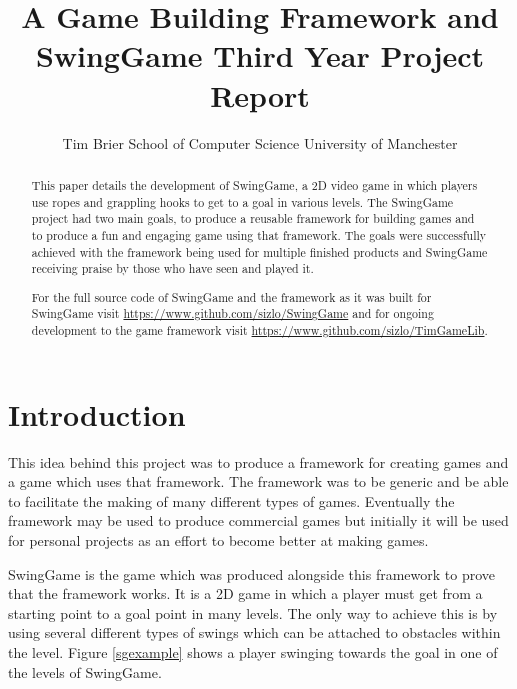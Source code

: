 \documentclass[]{report}
\title{
	A Game Building Framework and SwingGame\endgraf
	Third Year Project Report
}
\author{
	\parbox{\linewidth}{
		\centering%
		Tim Brier\endgraf
		School of Computer Science\endgraf
		University of Manchester
	}
}
\date{
	\parbox{\linewidth}{
		\centering%
		April 2015\endgraf\bigskip
		Supervised by Dr Steve Pettifer
	}
}
\begin{document}
\maketitle

\begin{abstract}
This paper details the development of SwingGame, a 2D video game in which players use ropes and grappling hooks to get to a goal in various levels.  The SwingGame project had two main goals, to produce a reusable framework for building games and to produce a fun and engaging game using that framework. The goals were successfully achieved with the framework being used for multiple finished products and SwingGame receiving praise by those who have seen and played it.

For the full source code of SwingGame and the framework as it was built for SwingGame visit \url{https://www.github.com/sizlo/SwingGame} and for ongoing development to the game framework visit \url{https://www.github.com/sizlo/TimGameLib}.
\end{abstract}

\tableofcontents

\chapter{Introduction}
This idea behind this project was to produce a framework for creating games and a game which uses that framework. The framework was to be generic and be able to facilitate the making of many different types of games. Eventually the framework may be used to produce commercial games but initially it will be used for personal projects as an effort to become better at making games.

SwingGame is the game which was produced alongside this framework to prove that the framework works. It is a 2D game in which a player must get from a starting point to a goal point in many levels. The only way to achieve this is by using several different types of swings which can be attached to obstacles within the level. Figure \ref{sgexample} shows a player swinging towards the goal in one of the levels of SwingGame.
\end{document}
